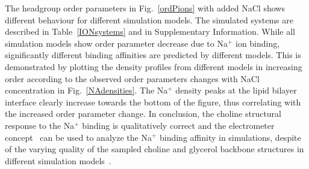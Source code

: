 \documentclass[pre,aps,floatfix,authordate1-4,twocolumn]{revtex4-1}
\begin{document}
The headgroup order parameters in Fig.~\ref{ordPions} with added NaCl shows different behaviour for different simulation
models. The simulated systems are described in Table~\ref{IONsystems} and in Supplementary Information. 
While all simulation models show order parameter decrease due to Na$^+$ ion binding, 
significantly different binding affinities are predicted by different models.
This is demonstrated by plotting the density profiles from different models 
in increasing order according to the observed order parameters changes with NaCl concentration
in Fig.~\ref{NAdensities}. The Na$^+$ density peaks at the lipid bilayer interface clearly increase 
towards the bottom of the figure, thus correlating with the increased order parameter change. 
In conclusion, the choline structural response to the Na$^+$ binding is qualitatively correct 
and the electrometer concept~\cite{akutsu81,altenbach84,seelig87,scherer89} can be used to analyze the
Na$^+$ binding affinity in simulations, despite of the varying quality of the sampled choline and 
glycerol backbone structures in different simulation models~\cite{botan15}.
\end{document}
